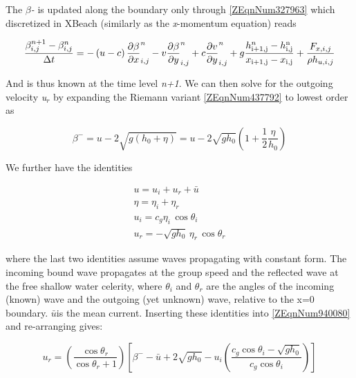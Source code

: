 The \textit{$\beta $-} is updated along the boundary only through \eqref{ZEqnNum327963} which discretized in XBeach (similarly as the \textit{x}-momentum equation) reads 

\begin{equation} \label{2.52)} 
\frac{\beta _{i,j}^{n+1} -\beta _{i,j}^{n} }{\Delta t} =-\left(u-c\right)\frac{\partial \beta }{\partial x} _{i,j}^{n} -v\frac{\partial \beta }{\partial y} _{i,j}^{n} +c\frac{\partial v}{\partial y} _{i,j}^{n} +g\frac{h_{{\rm i+1,j}}^{n} -h_{{\rm i,j}}^{{\rm n}} }{x_{{\rm i+1,j}} -x_{{\rm i,j}} } +\frac{F_{x,i,j} }{\rho h_{u,i,j} }  
\end{equation} 

And is thus known at the time level \textit{n+1}. We can then solve for the outgoing velocity \textit{u${}_{r}$} by expanding the Riemann variant \eqref{ZEqnNum437792} to lowest order as

\begin{equation} \label{ZEqnNum940080} 
\beta ^{-} =u-2\sqrt{g(h_{0} +\eta )} =u-2\sqrt{gh_{0} } \left(1+\frac{1}{2} \frac{\eta }{h_{0} } \right) 
\end{equation} 

We further have the identities

\begin{equation} \label{2.54)} 
\begin{array}{l} {u=u_{i} +u_{r} +\bar{u}} \\ {\eta =\eta _{i} +\eta _{r} } \\ {u_{i} =c_{g} \eta _{i} \, \cos \theta _{i} } \\ {u_{r} =-\sqrt{gh_{0} } \, \eta _{r} \, \cos \theta _{r} } \end{array} 
\end{equation} 

where the last two identities assume waves propagating with constant form. The incoming bound wave propagates at the group speed and the reflected wave at the free shallow water celerity,  where \textit{$\theta $${}_{i}$} and \textit{$\theta $${}_{r}$} are the angles of the incoming (known) wave and the outgoing (yet unknown) wave, relative to the x=0 boundary. $\bar{u}$is the mean current. Inserting these identities into \eqref{ZEqnNum940080} and re-arranging gives:

\begin{equation} \label{ZEqnNum523309} 
u_{r} =\left(\frac{\cos \theta _{r} }{\cos \theta _{r} +1} \right)\left[\beta ^{-} -\bar{u}+2\sqrt{gh_{0} } -u_{i} \left(\frac{c_{g} \cos \theta _{i} -\sqrt{gh_{0} } }{c_{g} \cos \theta _{i} } \right)\right] 
\end{equation} 

